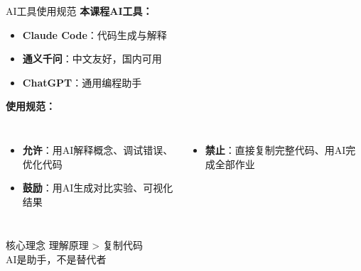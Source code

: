 \begin{frame}{AI工具使用规范}
    \textbf{本课程AI工具：}
    \begin{itemize}
        \item \textbf{Claude Code}：代码生成与解释
        \item \textbf{通义千问}：中文友好，国内可用
        \item \textbf{ChatGPT}：通用编程助手
    \end{itemize}

    \vspace{0.5cm}

    \textbf{使用规范：}
    \begin{columns}
        \begin{itemize}
            \item[\textcolor{green}{\checkmark}] \textbf{允许}：用AI解释概念、调试错误、优化代码
            \item[\textcolor{green}{\checkmark}] \textbf{鼓励}：用AI生成对比实验、可视化结果
        \end{itemize}

        \begin{itemize}
            \item[\textcolor{red}{$\times$}] \textbf{禁止}：直接复制完整代码、用AI完成全部作业
        \end{itemize}
    \end{columns}

    \vspace{0.5cm}
    \begin{block}{核心理念}
        理解原理 > 复制代码\\
        AI是助手，不是替代者
    \end{block}
\end{frame}

